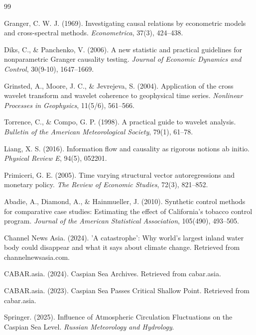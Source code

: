\documentclass[12pt,a4paper,twocolumn]{article}
\begin{document}
\begin{thebibliography}{99}

Granger, C. W. J. (1969). Investigating causal relations by econometric models and cross-spectral methods. \textit{Econometrica}, 37(3), 424–438.

Diks, C., \& Panchenko, V. (2006). A new statistic and practical guidelines for nonparametric Granger causality testing. \textit{Journal of Economic Dynamics and Control}, 30(9-10), 1647–1669.

Grinsted, A., Moore, J. C., \& Jevrejeva, S. (2004). Application of the cross wavelet transform and wavelet coherence to geophysical time series. \textit{Nonlinear Processes in Geophysics}, 11(5/6), 561–566.

Torrence, C., \& Compo, G. P. (1998). A practical guide to wavelet analysis. \textit{Bulletin of the American Meteorological Society}, 79(1), 61–78.

Liang, X. S. (2016). Information flow and causality as rigorous notions ab initio. \textit{Physical Review E}, 94(5), 052201.

Primiceri, G. E. (2005). Time varying structural vector autoregressions and monetary policy. \textit{The Review of Economic Studies}, 72(3), 821–852.

Abadie, A., Diamond, A., \& Hainmueller, J. (2010). Synthetic control methods for comparative case studies: Estimating the effect of California's tobacco control program. \textit{Journal of the American Statistical Association}, 105(490), 493–505.

Channel News Asia. (2024). 'A catastrophe': Why world's largest inland water body could disappear and what it says about climate change. Retrieved from channelnewsasia.com.

CABAR.asia. (2024). Caspian Sea Archives. Retrieved from cabar.asia.

CABAR.asia. (2023). Caspian Sea Passes Critical Shallow Point. Retrieved from cabar.asia.

Springer. (2025). Influence of Atmospheric Circulation Fluctuations on the Caspian Sea Level. \textit{Russian Meteorology and Hydrology}.


\end{thebibliography}
\end{document}
